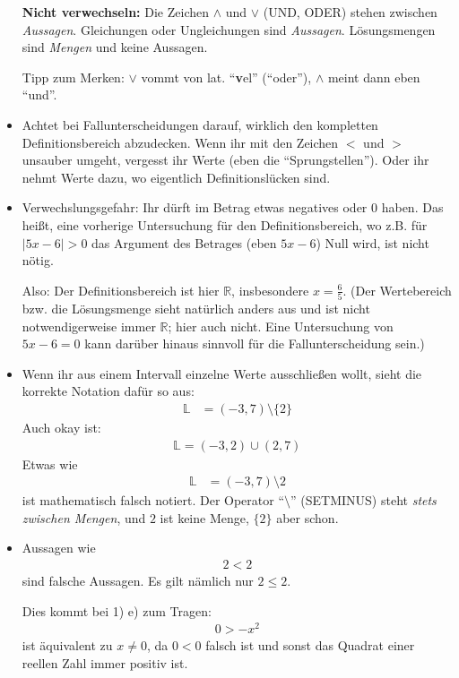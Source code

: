 \documentclass[11pt, a4paper]{article}
\newcommand{\Lsg}{\mathbb{L}}
\newcommand{\R}{\mathbb{R}}
\begin{document}
\begin{itemize}
\textbf{Nicht verwechseln:} Die Zeichen $\land$ und $\lor$ (UND, ODER) stehen zwischen \emph{Aussagen}. Gleichungen oder Ungleichungen sind \emph{Aussagen}. Lösungsmengen sind \emph{Mengen} und keine Aussagen. 

Tipp zum Merken: $\lor$ vommt von lat. \enquote{\textbf{v}el} (\enquote{oder}), $\land$ meint dann eben \enquote{und}.

\item Achtet bei Fallunterscheidungen darauf, wirklich den kompletten Definitionsbereich abzudecken. Wenn ihr mit den Zeichen $<$ und $>$ unsauber umgeht, vergesst ihr Werte (eben die \enquote{Sprungstellen}). Oder ihr nehmt Werte dazu, wo eigentlich Definitionslücken sind.

\item Verwechslungsgefahr: Ihr dürft im Betrag etwas negatives oder 0 haben. Das heißt, eine vorherige Untersuchung für den Definitionsbereich, wo z.B. für $|5x - 6| > 0$ das Argument des Betrages (eben $5x - 6$) Null wird, ist nicht nötig.

Also: Der Definitionsbereich ist hier $\R$, insbesondere $x = \frac{6}{5}$. (Der Wertebereich bzw. die Lösungsmenge sieht natürlich anders aus und ist nicht notwendigerweise immer $\R$; hier auch nicht. Eine Untersuchung von $5x - 6 = 0$ kann darüber hinaus sinnvoll für die Fallunterscheidung sein.) 

\item Wenn ihr aus einem Intervall einzelne Werte ausschließen wollt, sieht die korrekte Notation dafür so aus:
\begin{align*}
\Lsg &= (-3,7) \setminus \{2\}
\end{align*}
Auch okay ist:
\begin{align*}
 \Lsg  = (-3,2) \cup (2,7)
\end{align*}
Etwas wie 
\begin{align*}
\Lsg &= (-3,7) \setminus 2
\end{align*}
ist mathematisch falsch notiert. Der Operator \enquote{$\setminus$} (SETMINUS) steht \emph{stets zwischen Mengen}, und $2$ ist keine Menge, $\{2\}$ aber schon. 

\item Aussagen wie
\begin{align*}
 2 < 2
\end{align*}
sind falsche Aussagen. Es gilt nämlich nur $2 \leq 2$.

Dies kommt bei 1) e) zum Tragen:
\begin{align*}
 0 > -x^2
\end{align*}
ist äquivalent zu $x \neq 0$, da $0 < 0$ falsch ist und sonst das Quadrat einer reellen Zahl immer positiv ist.


\end{itemize}
\end{document}
